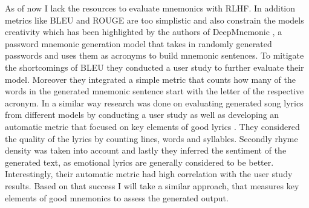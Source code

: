 As of now I lack the resources to evaluate mnemonics with RLHF. In addition metrics like BLEU and ROUGE are too simplistic and also constrain the models creativity which has been highlighted by the authors of DeepMnemonic \cite{deepMnemonic2022}, a password mnemonic generation model that takes in randomly generated passwords and uses them as acronyms to build mnemonic sentences. To mitigate the shortcomings of BLEU they conducted a user study to further evaluate their model. Moreover they integrated a simple metric that counts how many of the words in the generated mnemonic sentence start with the letter of the respective acronym. 
In a similar way research was done on evaluating generated song lyrics from different models by conducting a user study as well as developing an automatic metric that focused on key elements of good lyrics \cite{lyrics_gen_2021}. They considered the quality of the lyrics by counting lines, words and syllables. Secondly rhyme density was taken into account and lastly they inferred the sentiment of the generated text, as emotional lyrics are generally considered to be better. Interestingly, their automatic metric had high correlation with the user study results. Based on that success I will take a similar approach, that measures key elements of good mnemonics to assess the generated output. 
